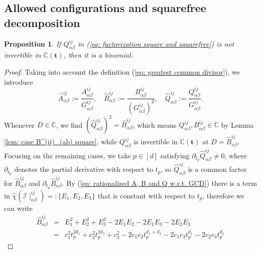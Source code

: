 \documentclass[10pt]{article}
\newtheorem{prop}{Proposition}%
\theoremstyle{remark}%
\theoremstyle{definition}%
\begin{document}
\subsection{\label{subsec: allowed configuration for radical terms} Allowed configurations and squarefree decomposition}
\begin{prop}
\label{prop: factor for square and GCD} 
If $Q_{\alpha\beta}^{ij}$ in (\ref{eq: factorization square and squarefree}) is not invertible in $\mathbb{C}(\mathbf{t})$, then it is a binomial. 
\end{prop}
\begin{proof}
Taking into account the definition (\ref{eq: greatest common divisor}), we introduce 
 \begin{equation}
\hat{A}_{\alpha\beta}^{ij}:=\frac{A_{\alpha\beta}^{ij}}{G_{\alpha\beta}^{ij}},\quad\hat{B}_{\alpha\beta}^{ij}:=\frac{B_{\alpha\beta}^{ij}}{(G_{\alpha\beta}^{ij})^{2}},\quad\hat{Q}_{\alpha\beta}^{ij}:=\frac{Q_{\alpha\beta}^{ij}}{G_{\alpha\beta}^{ij}}.
\label{eq: rationalized A, B and Q w.r.t. GCD}
 \end{equation}
Whenever $D\in\mathbb{C}$, we find $(\hat{Q}_{\alpha\beta}^{ij})^{2}=\hat{B}_{\alpha\beta}^{ij}$, which means $Q_{\alpha\beta}^{ij},B_{\alpha\beta}^{ij}\in\mathbb{C}$ by Lemma \ref{lem: case B^(ij)_(ab) square}, while $Q_{\alpha\beta}^{ij}$ is invertible in $\mathbb{C}(\mathbf{t})$ at $D=\hat{B}_{\alpha\beta}^{ij}$. Focusing on the remaining cases, 
%
we take $p\in[d]$ satisfying $\partial_{t_{p}}\hat{Q}_{\alpha\beta}^{ij}\neq0$, where $\partial_{t_{p}}$ denotes the partial derivative with respect
to $t_{p}$, so $\hat{Q}_{\alpha\beta}^{ij}$ is a common factor for $\hat{B}_{\alpha\beta}^{ij}$ and $\partial_{t_{p}}\hat{B}_{\alpha\beta}^{ij}$. By (\ref{eq: rationalized A, B and Q w.r.t. GCD}) there is a term in $\hat{\chi}(\mathcal{I}\mid_{\alpha\beta}^{ij})=:\{E_{1},E_{2},E_{3}\}$ that is constant with respect to $t_{p}$, therefore we can write
\begin{eqnarray}
\hat{B}_{\alpha\beta}^{ij}
& = & E_{1}^{2}+E_{2}^{2}+E_{3}^{2}-2E_{1}E_{2}-2E_{1}E_{3}-2E_{2}E_{3}
\label{eq: univariate B, E}\\
& = & c_{1}^{2}t_{p}^{2d_{1}}+c_{2}^{2}t_{p}^{2d_{2}}+c_{3}^{2}-2c_{1}c_{2}t_{p}^{d_{1}+d_{2}}-2c_{1}c_{3}t_{p}^{d_{1}}-2c_{2}c_{3}t_{p}^{d_{2}}

\end{eqnarray}
\end{proof}
\end{document}
